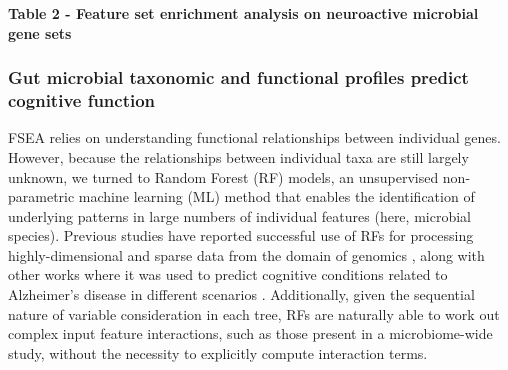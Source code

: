 \documentclass[a4paper]{article}
\begin{document}
\textbf{Table 2 - Feature set enrichment analysis on neuroactive microbial gene sets}

\subsubsection{Gut microbial taxonomic and functional profiles predict cognitive function}

FSEA relies on understanding functional relationships between individual
genes. However, because the relationships between individual taxa are
still largely unknown, we turned to Random Forest (RF) models, an
unsupervised non-parametric machine learning (ML) method that enables
the identification of underlying patterns in large numbers of individual
features (here, microbial species). Previous studies have reported
successful use of RFs for processing highly-dimensional and sparse data
from the domain of genomics
\cite{amaratungaEnrichedRandomForests2008,brieucPracticalIntroductionRandom2018,chenRandomForestsGenomic2012,franzosaGutMicrobiomeStructure2019,stephanRandomForestApproach2015},
along with other works where it was used
to predict cognitive conditions related to Alzheimer's disease in
different scenarios
\cite{ardekaniPredictionIncipientAlzheimer2017,velazquezRandomForestModel2021}.
Additionally, given the sequential
nature of variable consideration in each tree, RFs are naturally able to
work out complex input feature interactions, such as those present in a
microbiome-wide study, without the necessity to explicitly compute
interaction terms.
\end{document}
